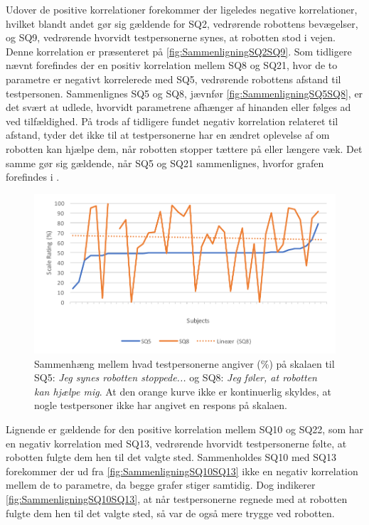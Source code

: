 Udover de positive korrelationer forekommer der ligeledes negative korrelationer, hvilket blandt andet gør sig gældende for SQ2, vedrørende robottens bevægelser, og SQ9, vedrørende hvorvidt testpersonerne synes, at robotten stod i vejen. Denne korrelation er præsenteret på \autoref{fig:SammenligningSQ2SQ9}. Som tidligere nævnt forefindes der en positiv korrelation mellem SQ8 og SQ21, hvor de to parametre er negativt korrelerede med SQ5, vedrørende robottens afstand til testpersonen. Sammenlignes SQ5 og SQ8, jævnfør \autoref{fig:SammenligningSQ5SQ8}, er det svært at udlede, hvorvidt parametrene afhænger af hinanden eller følges ad ved tilfældighed. På trods af tidligere fundet negativ korrelation relateret til afstand, tyder det ikke til at testpersonerne har en ændret oplevelse af om robotten kan hjælpe dem, når robotten stopper tættere på eller længere væk. Det samme gør sig gældende, når SQ5 og SQ21 sammenlignes, hvorfor grafen forefindes i . 
%
\begin{figure}[H]
	\centering
	\includegraphics[width=\textwidth]{Figure/Korrelationsgrafer/SQ5+SQ8}
	\caption{Sammenhæng mellem hvad testpersonerne angiver (\%) på skalaen til SQ5: \textit{Jeg synes robotten stoppede...} og SQ8: \textit{Jeg føler, at robotten kan hjælpe mig}. At den orange kurve ikke er kontinuerlig skyldes, at nogle testpersoner ikke har angivet en respons på skalaen.}
	\label{fig:SammenligningSQ5SQ8}
\end{figure}
\noindent
%
Lignende er gældende for den positive korrelation mellem SQ10 og SQ22, som har en negativ korrelation med SQ13, vedrørende hvorvidt testpersonerne følte, at robotten fulgte dem hen til det valgte sted. Sammenholdes SQ10 med SQ13 forekommer der ud fra \autoref{fig:SammenligningSQ10SQ13} ikke en negativ korrelation mellem de to parametre, da begge grafer stiger samtidig. Dog indikerer \autoref{fig:SammenligningSQ10SQ13}, at når testpersonerne regnede med at robotten fulgte dem hen til det valgte sted, så var de også mere trygge ved robotten. 

